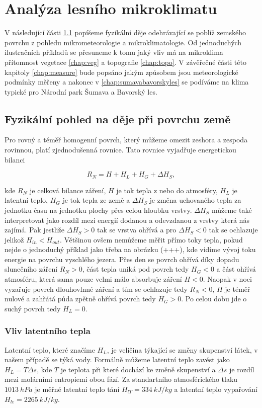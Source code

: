 \chapter{Analýza lesního mikroklimatu}
\label{chap:ch1}

V následující části \ref{chap:fyz} popíšeme fyzikální děje odehrávající se poblíž zemského povrchu z pohledu mikrometeorologie a mikroklimatologie. Od jednoduchých ilustračních příkladů se přesuneme k tomu jaký vliv má na mikroklima přítomnost vegetace \ref{chap:veg} a topografie \ref{chap:topo}. V závěřečné části této kapitoly \ref{chap:measure} bude popsáno jakým způsobem jsou meteorologické podmínky měřeny a nakonec v \ref{chap:sumavabavorskyles} se podíváme na klima typické pro Národní park Šumava a Bavorský les.

\section{Fyzikální pohled na děje při povrchu země} \label{chap:fyz}
Pro rovný a téměř homogenní povrch, který můžeme omezit zeshora a zespoda rovinnou, platí zjednodušenná rovnice. Tato rovnice vyjadřuje energetickou bilanci\cite{arya2001}

$$R_N = H + H_L + H_G + \Delta H_S,$$\label{eq:bilance}

kde $R_N$ je celková bilance záření, $H$ je tok tepla z nebo do atmosféry, $H_L$ je latentní teplo, $H_G$ je tok tepla ze země a $\Delta H_S$ je změna uchovaného tepla za jednotku času na jednotku plochy přes celou hloubku vrstvy. $\Delta H_S$ můžeme také interpretovat jako rozdíl mezi energií dodanou a odevzdanou z vrstvy která nás zajímá. Pak jestliže $\Delta H_S>0$ tak se vrstva ohřívá a pro $\Delta H_S<0$ tak se ochlazuje jelikož $H_{in}<H_{out}$. Většinou ovšem nemůžeme měřit přímo toky tepla, pokud nejde o jednoduchý příklad jako třeba na obrázku (+++), kde vidíme vývoj toku energie na povrchu vyschlého jezera. Přes den se povrch ohřívá díky dopadu slunečního záření $R_N>0$, část tepla uniká pod povrch tedy $H_G<0$ a část ohřívá atmosféru, která sama pouze velmi málo absorbuje záření $H<0$. Naopak v noci vyzařuje povrch dlouhovlnné záření a tím se ochlazuje tedy $R_N<0$, $H$ je téměř nulové a zahřátá půda zpětně ohřívá povrch tedy $H_G>0$. Po celou dobu jde o suchý povrch tedy $H_L=0$\cite{arya2001}.

\subsection{Vliv latentního tepla}
Latentní teplo, které značíme $H_L$, je veličina týkající se změny skupenství látek, v našem případě se týká vody. Formálně můžeme latentní teplo zavést jako $H_L = T\Delta s$, kde $T$ je teplota při které dochází ke změně skupenství a $\Delta s$ je rozdíl mezi molárními entropiemi obou fází\cite{callen1985}. Za standartního atmosférického tlaku $\SI{1013}{hPa}$ je měřné latentní teplo tání $H_{lT} = \SI{334}{kJ/kg}$ a latentní teplo vypařování $H_{lv} = \SI{2265}{kJ/kg}$. 

